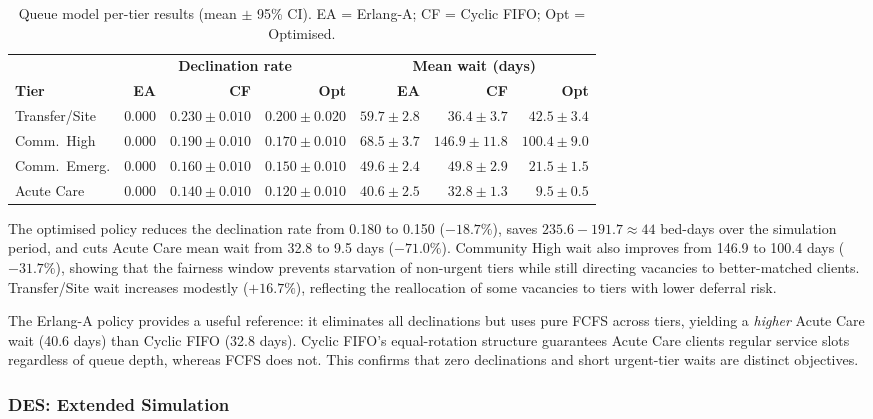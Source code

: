 \begin{table}[H]
\centering
\caption{Queue model per-tier results (mean $\pm$ 95\% CI).
         EA = Erlang-A; CF = Cyclic FIFO; Opt = Optimised.}
\label{tab:vch_tier}
\begin{tabular}{lrrrrrr}
\toprule
& \multicolumn{3}{c}{\textbf{Declination rate}} & \multicolumn{3}{c}{\textbf{Mean wait (days)}} \\
\cmidrule(lr){2-4} \cmidrule(lr){5-7}
\textbf{Tier} & \textbf{EA} & \textbf{CF} & \textbf{Opt} & \textbf{EA} & \textbf{CF} & \textbf{Opt} \\
\midrule
Transfer/Site & 0.000 & $0.230 \pm 0.010$ & $0.200 \pm 0.020$ & $59.7 \pm 2.8$ & $36.4 \pm 3.7$ & $42.5 \pm 3.4$ \\
Comm.\ High   & 0.000 & $0.190 \pm 0.010$ & $0.170 \pm 0.010$ & $68.5 \pm 3.7$ & $146.9 \pm 11.8$ & $100.4 \pm 9.0$ \\
Comm.\ Emerg. & 0.000 & $0.160 \pm 0.010$ & $0.150 \pm 0.010$ & $49.6 \pm 2.4$ & $49.8 \pm 2.9$ & $21.5 \pm 1.5$ \\
Acute Care    & 0.000 & $0.140 \pm 0.010$ & $0.120 \pm 0.010$ & $40.6 \pm 2.5$ & $32.8 \pm 1.3$ & $9.5 \pm 0.5$ \\
\bottomrule
\end{tabular}
\end{table}

\noindent
The optimised policy reduces the declination rate from 0.180 to 0.150 ($-18.7\%$),
saves $235.6 - 191.7 \approx 44$ bed-days over the simulation period, and cuts Acute
Care mean wait from 32.8 to 9.5 days ($-71.0\%$).  Community High wait also improves
from 146.9 to 100.4 days ($-31.7\%$), showing that the fairness window prevents
starvation of non-urgent tiers while still directing vacancies to better-matched clients.
Transfer/Site wait increases modestly ($+16.7\%$), reflecting the reallocation of some
vacancies to tiers with lower deferral risk.

The Erlang-A policy provides a useful reference: it eliminates all declinations but uses
pure FCFS across tiers, yielding a \emph{higher} Acute Care wait (40.6 days) than Cyclic
FIFO (32.8 days).  Cyclic FIFO's equal-rotation structure guarantees Acute Care clients
regular service slots regardless of queue depth, whereas FCFS does not.  This confirms
that zero declinations and short urgent-tier waits are distinct objectives.

\subsubsection{DES: Extended Simulation}
\label{sec:des_results}

